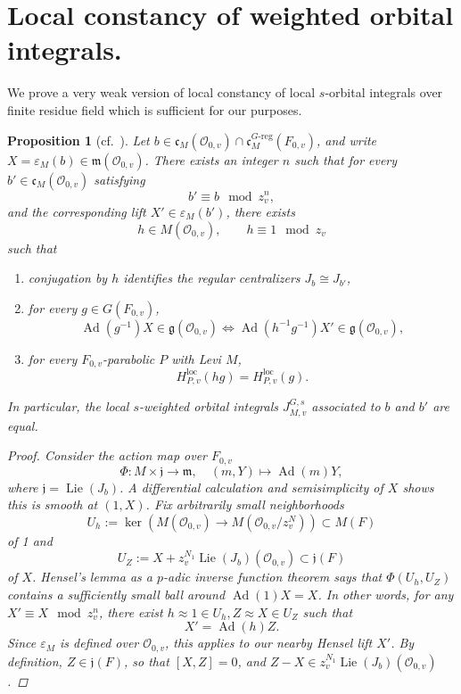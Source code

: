 \documentclass[openany]{amsbook}
\newtheorem{proposition}[theorem]{Proposition}
\theoremstyle{definition}
\theoremstyle{remark}
\numberwithin{equation}{section}
\renewcommand{\O}{\mathcal{O}}
\renewcommand{\epsilon}{\varepsilon}
\renewcommand{\-}{\operatorname{-}}
\newcommand{\on}[1]{\operatorname{#1}}
\newcommand{\fm}{\mathfrak{m}}
\newcommand{\fc}{\mathfrak{c}}
\renewcommand{\fm}{\mathfrak{m}}
\renewcommand{\fg}{\mathfrak{g}}
\newcommand{\fj}{\mathfrak{j}}
\newcommand{\Greg}{G\text{-reg}}
\newcommand{\Lie}{\on{Lie}}
\newcommand{\Ad}{\on{Ad}}
\newcommand{\loc}{\mathrm{loc}}
\begin{document}
\section{Local constancy of weighted orbital integrals.}

We prove a very weak version of local constancy of local $s$-orbital integrals over finite residue field which is sufficient for our purposes.
\begin{proposition}[{cf.\ \cite[\S 18.7]{CLII}}]\label{prop.local.constancy}
    Let $b \in \fc_M(\O_{0,v}) \cap \fc_M^{\Greg}(F_{0,v})$, and write $X = \epsilon_M(b) \in \fm(\O_{0,v})$. There exists an integer $n$ such that for every $b' \in \fc_M(\O_{0,v})$ satisfying
    $$
        b' \equiv b \mod z_v^n,
    $$
    and the corresponding lift $X' \in \epsilon_M(b')$, there exists
    $$
        h \in M(\O_{0,v}), \qquad h \equiv 1 \mod z_v
    $$
    such that
    \begin{enumerate}
        \item conjugation by $h$ identifies the regular centralizers $J_b \cong J_{b'}$,
        \item for every $g \in G(F_{0,v})$,
        $$
            \Ad(g^{-1}) X \in \fg(\O_{0,v}) \Longleftrightarrow \Ad(h^{-1}g^{-1}) X' \in \fg(\O_{0,v}),
        $$
        \item for every $F_{0,v}$-parabolic $P$ with Levi $M$,
        $$
            H_{P,v}^{\loc}(hg) = H_{P,v}^{\loc}(g).
        $$
    \end{enumerate}
    In particular, the local $s$-weighted orbital integrals $J_{M,v}^{G,s}$ associated to $b$ and $b'$ are equal.
    \begin{proof}
        Consider the action map over $F_{0,v}$
        $$
            \Phi : M \times \fj \to \fm, \quad (m, Y) \mapsto \Ad(m)Y,
        $$
        where $\fj = \Lie(J_b)$. A differential calculation and semisimplicity of $X$ shows this is smooth at $(1, X)$. Fix arbitrarily small neighborhoods 
        $$
            U_h := \ker(M(\O_{0,v}) \to M(\O_{0,v}/z_v^N)) \subset M(F)
        $$
        of 1 and 
        $$
            U_Z := X + z_v^{N_1} \Lie(J_b)(\O_{0,v}) \subset \fj(F)
        $$
        of $X$. Hensel's lemma as a $p$-adic inverse function theorem says that $\Phi(U_h, U_Z)$ contains a sufficiently small ball around $\Ad(1)X = X$. In other words, for any $X' \equiv X \mod z_v^n$, there exist $h \approx 1 \in U_h, Z\approx X \in U_Z$ such that 
        $$
            X' = \Ad(h)Z.
        $$
        Since $\epsilon_M$ is defined over $\O_{0,v}$, this applies to our nearby Hensel lift $X'$. By definition, $Z \in \fj(F)$, so that $[X,Z] = 0$, and $Z - X \in z_v^{N_1} \Lie(J_b)(\O_{0,v})$.


\end{proof}
\end{proposition}
\end{document}
